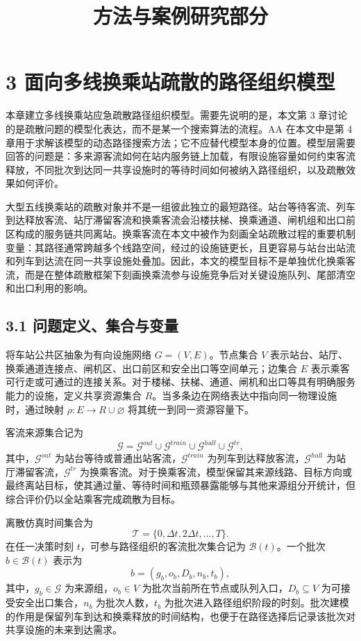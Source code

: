 \documentclass[UTF8,a4paper,12pt]{ctexart}
\title{方法与案例研究部分}
\author{}
\date{}
\begin{document}
\maketitle

\section{3 面向多线换乘站疏散的路径组织模型}

本章建立多线换乘站应急疏散路径组织模型。需要先说明的是，本文第 3 章讨论的是疏散问题的模型化表达，而不是某一个搜索算法的流程。AA 在本文中是第 4 章用于求解该模型的动态路径搜索方法；它不应替代模型本身的位置。模型层需要回答的问题是：多来源客流如何在站内服务链上加载，有限设施容量如何约束客流释放，不同批次到达同一共享设施时的等待时间如何被纳入路径组织，以及疏散效果如何评价。

大型五线换乘站的疏散对象并不是一组彼此独立的最短路径。站台等待客流、列车到达释放客流、站厅滞留客流和换乘客流会沿楼扶梯、换乘通道、闸机组和出口前区构成的服务链共同离站。换乘客流在本文中被作为刻画全站疏散过程的重要机制变量：其路径通常跨越多个线路空间，经过的设施链更长，且更容易与站台出站流和列车到达流在同一共享设施处叠加。因此，本文的模型目标不是单独优化换乘客流，而是在整体疏散框架下刻画换乘流参与设施竞争后对关键设施队列、尾部清空和出口利用的影响。

\subsection{3.1 问题定义、集合与变量}

将车站公共区抽象为有向设施网络 \(G=(V,E)\)。节点集合 \(V\) 表示站台、站厅、换乘通道连接点、闸机区、出口前区和安全出口等空间单元；边集合 \(E\) 表示乘客可行走或可通过的连接关系。对于楼梯、扶梯、通道、闸机和出口等具有明确服务能力的设施，定义共享资源集合 \(R\)。当多条边在网络表达中指向同一物理设施时，通过映射 \(\rho:E\rightarrow R\cup\varnothing\) 将其统一到同一资源容量下。

客流来源集合记为
\[
\mathcal G=\mathcal G^{out}\cup \mathcal G^{train}\cup \mathcal G^{hall}\cup \mathcal G^{tr},
\]
其中，\(\mathcal G^{out}\) 为站台等待或普通出站客流，\(\mathcal G^{train}\) 为列车到达释放客流，\(\mathcal G^{hall}\) 为站厅滞留客流，\(\mathcal G^{tr}\) 为换乘客流。对于换乘客流，模型保留其来源线路、目标方向或最终离站目标，使其通过量、等待时间和瓶颈暴露能够与其他来源组分开统计，但综合评价仍以全站乘客完成疏散为目标。

离散仿真时间集合为
\[
\mathcal T=\{0,\Delta t,2\Delta t,\ldots,T\}.
\]
在任一决策时刻 \(t\)，可参与路径组织的客流批次集合记为 \(\mathcal B(t)\)。一个批次 \(b\in\mathcal B(t)\) 表示为
\[
b=(g_b,o_b,D_b,n_b,t_b),
\]
其中，\(g_b\in\mathcal G\) 为来源组，\(o_b\in V\) 为批次当前所在节点或队列入口，\(D_b\subseteq V\) 为可接受安全出口集合，\(n_b\) 为批次人数，\(t_b\) 为批次进入路径组织阶段的时刻。批次建模的作用是保留列车到达和换乘释放的时间结构，也便于在路径选择后记录该批次对共享设施的未来到达需求。
\end{document}
